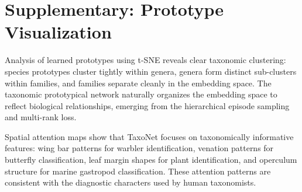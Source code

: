 \section{Supplementary: Prototype Visualization}

\label{app:visualization}

Analysis of learned prototypes using t-SNE reveals clear taxonomic
clustering: species prototypes cluster tightly within genera, genera form
distinct sub-clusters within families, and families separate cleanly in
the embedding space. The taxonomic prototypical network naturally
organizes the embedding space to reflect biological relationships,
emerging from the hierarchical episode sampling and multi-rank loss.

Spatial attention maps show that TaxoNet focuses on taxonomically
informative features: wing bar patterns for warbler identification,
venation patterns for butterfly classification, leaf margin shapes for
plant identification, and operculum structure for marine gastropod
classification. These attention patterns are consistent with the
diagnostic characters used by human taxonomists.

